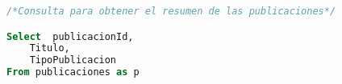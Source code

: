    \begin{lstlisting}[language=SQL]
/*Consulta para obtener el resumen de las publicaciones*/

Select	publicacionId,
	Titulo,
	TipoPublicacion
From publicaciones as p 

  \end{lstlisting}
